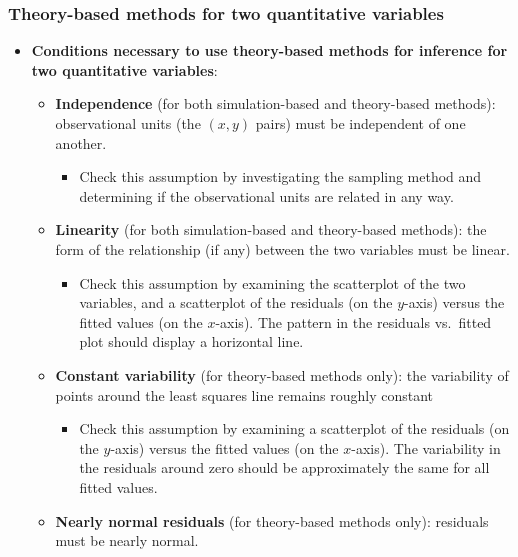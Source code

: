 \documentclass[
]{report}
\providecommand{\tightlist}{%
  \setlength{\itemsep}{0pt}\setlength{\parskip}{0pt}}
\begin{document}
\subsubsection*{Theory-based methods for two quantitative variables}\label{theory-based-methods-for-two-quantitative-variables}

\begin{itemize}
\item
  \textbf{Conditions necessary to use theory-based methods for inference for two quantitative variables}:

  \begin{itemize}
  \item
    \textbf{Independence} (for both simulation-based and theory-based methods): observational units (the \((x, y)\) pairs) must be independent of one another.

    \begin{itemize}
    \tightlist
    \item
      Check this assumption by investigating the sampling method and determining if the observational units are related in any way.
    \end{itemize}
  \item
    \textbf{Linearity} (for both simulation-based and theory-based methods): the form of the relationship (if any) between the two variables must be linear.

    \begin{itemize}
    \tightlist
    \item
      Check this assumption by examining the scatterplot of the two variables, and a scatterplot of the residuals (on the \(y\)-axis) versus the fitted values (on the \(x\)-axis). The pattern in the residuals vs.~fitted plot should display a horizontal line.
    \end{itemize}
  \item
    \textbf{Constant variability} (for theory-based methods only): the variability of points around the least squares line remains roughly constant

    \begin{itemize}
    \tightlist
    \item
      Check this assumption by examining a scatterplot of the residuals (on the \(y\)-axis) versus the fitted values (on the \(x\)-axis). The variability in the residuals around zero should be approximately the same for all fitted values.
    \end{itemize}
  \item
    \textbf{Nearly normal residuals} (for theory-based methods only): residuals must be nearly normal.


\end{itemize}
\end{itemize}
\end{document}
